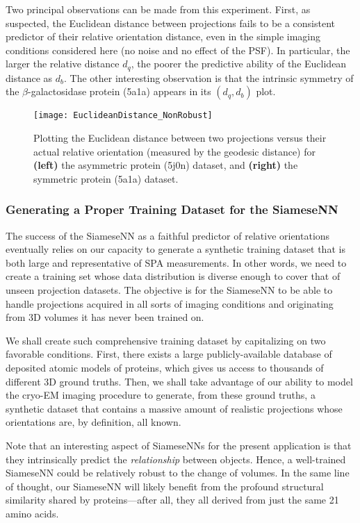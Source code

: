 Two principal observations can be made from this experiment. First, as suspected, the Euclidean distance between projections fails to be a consistent predictor of their relative orientation distance, even in the simple imaging conditions considered here (no noise and no effect of the PSF). In particular, the larger the relative distance $d_q$, the poorer the predictive ability of the Euclidean distance as $d_b$. The other interesting observation is that the intrinsic symmetry of the $\beta$-galactosidase protein (5a1a) appears in its $(d_q,d_b)$ plot.

\begin{figure}
    \centering
    \texttt{[image: EuclideanDistance\_NonRobust]}
    \caption{Plotting the Euclidean distance between two projections versus their actual relative orientation (measured by the geodesic distance) for \textbf{(left)} the asymmetric protein (5j0n) dataset, and \textbf{(right)} the symmetric protein (5a1a) dataset. }
    \label{fig:euclidean-not-robust}
\end{figure}

\subsubsection{Generating a Proper Training Dataset for the SiameseNN}
\label{sec:training-siamese}

The success of the SiameseNN as a faithful predictor of relative orientations eventually relies on our capacity to generate a synthetic training dataset that is both large and representative of SPA measurements. In other words, we need to create a training set whose data distribution is diverse enough to cover that of unseen projection datasets. The objective is for the SiameseNN to be able to handle projections acquired in all sorts of imaging conditions and originating from 3D volumes it has never been trained on.

We shall create such comprehensive training dataset by capitalizing on two favorable conditions. First, there exists a large publicly-available database of deposited atomic models of proteins, which gives us access to thousands of different 3D ground truths. Then, we shall take advantage of our ability to model the cryo-EM imaging procedure to generate, from these ground truths, a synthetic dataset that contains a massive amount of realistic projections whose orientations are, by definition, all known.

Note that an interesting aspect of SiameseNNs for the present application is that they intrinsically predict the \textit{relationship} between objects. Hence, a well-trained SiameseNN could be relatively robust to the change of volumes. In the same line of thought, our SiameseNN will likely benefit from the profound structural similarity shared by proteins---after all, they all derived from just the same 21 amino acids.


